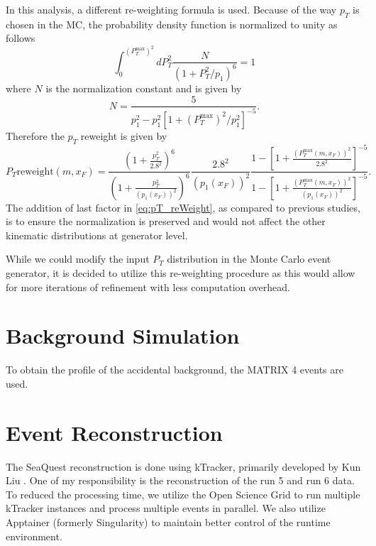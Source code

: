 \documentclass[../main.tex]{subfiles}
\begin{document}
In this analysis, a different re-weighting formula is used. Because of the way $p_T$ is chosen
in the MC, the probability density function is normalized to unity as follows
\begin{equation}
	\int^{\left(P_T^{\mathrm{max}}\right)^2}_0 dP_T^2 \frac{N}{\left(1+ P_T^2/p_1\right)^6}=1
\end{equation}
where $N$ is the normalization constant and is given by
\begin{equation}
	N=\frac{5}{p_1^2-p_1^2\left[ 1+ \left(P_T^{\mathrm{max}}\right)^2/p_1^2\right]^{-5}}.
\end{equation}
Therefore the $p_T$ reweight is given by
\begin{equation}
	P_T \mathrm{ reweight}\left(m,x_F\right)=
	\frac{\left(1 + \frac{p_T^2}{2.8^2} \right)^6}{\left(1 + \frac{p_T^2}{\left(p_1\left(x_F\right)\right)^2} \right)^6} \frac{2.8^2}{\left(p_1\left(x_F\right)\right)^2}\frac{1-\left[ 1+ \frac{\left(P_T^{\mathrm{max}}\left(m,x_F\right)\right)^2}{2.8^2}\right]^{-5}}{1-\left[ 1+ \frac{\left(P_T^{\mathrm{max}}\left(m,x_F\right)\right)^2}{\left(p_1\left(x_F\right)\right)^2}\right]^{-5}}.
	\label{eq:pT_reWeight}
\end{equation}
The addition of last factor in \cref{eq:pT_reWeight}, as compared to previous studies,
is to ensure the normalization is preserved and would not affect the other kinematic
distributions at generator level.

While we could modify the input $P_T$ distribution in the Monte Carlo event generator,
it is decided to utilize this re-weighting procedure as this would allow for
more iterations of refinement with less computation overhead.

\section{Background Simulation}
To obtain the profile of the accidental background, the MATRIX 4 events are used.



\section{Event Reconstruction}
The SeaQuest reconstruction is done using kTracker, primarily developed by Kun Liu \cite{kTracker}.
One of my responsibility is the reconstruction of the run 5 and run 6 data. To reduced the processing
time, we utilize the Open Science Grid \cite{ruthpordes2007,sfiligoi2009,OSGPool} to run multiple kTracker
instances and process multiple events in parallel.
We also utilize Apptainer (formerly Singularity)\cite{kurtzer2021} to maintain better control of the
runtime environment.
\end{document}
